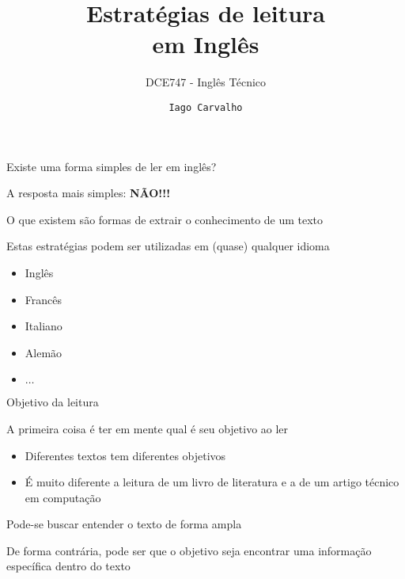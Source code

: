 \documentclass[compress,mathserif]{beamer}
\title{Estratégias de leitura \\ em Inglês}
\subtitle{DCE747 - Inglês Técnico}
\author{\texttt{Iago Carvalho}}
\institute{\texttt{Departamento de Ciência da Computação}}
\begin{document}
\begin{frame}
\titlepage

\end{frame}


\begin{frame}{Existe uma forma simples de ler em inglês?}

A resposta mais simples: \textbf{NÃO!!!}

\vspace{0.5cm}

O que existem são formas de extrair o conhecimento de um texto

\vspace{0.5cm}

Estas estratégias podem ser utilizadas em (quase) qualquer idioma
\begin{itemize}
    \item Inglês
    \item Francês
    \item Italiano
    \item Alemão
    \item $\ldots$
\end{itemize}

\end{frame}


\begin{frame}{Objetivo da leitura}

A primeira coisa é ter em mente qual é seu objetivo ao ler 
\begin{itemize}
    \item Diferentes textos tem diferentes objetivos
    \item É muito diferente a leitura de um livro de literatura e a de um artigo técnico em computação
\end{itemize}

\vspace{0.5cm}

Pode-se buscar entender o texto de forma ampla

\vspace{0.5cm}

De forma contrária, pode ser que o objetivo seja encontrar uma informação específica dentro do texto

\end{frame}

\end{document}
